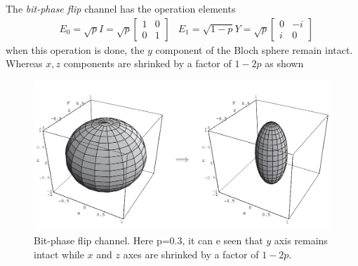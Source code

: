 The \textit{bit-phase flip} channel has the operation elements
\begin{align}
    &E_0 = \sqrt{p}I = \sqrt{p}\begin{bmatrix}
        1 & 0 \\ 0 & 1
    \end{bmatrix}
    &E_1 = \sqrt{1-p}Y = \sqrt{p}\begin{bmatrix}
        0 & -i \\ i & 0
    \end{bmatrix}
\end{align}
when this operation is done, the $y$ component of the Bloch sphere remain intact. Whereas $x,z$ components are shrinked by a factor of $1-2p$ as shown
\begin{figure}[H]
    \centering
    \includegraphics[width=\textwidth]{images/phase_flip_bloch.PNG}
    \caption{Bit-phase flip channel. Here p=0.3, it can e seen that $y$ axis remains intact while $x$ and $z$ axes are shrinked by a factor of $1-2p$.}
    \label{fig:bit_phase_flip_bloch}
\end{figure}
